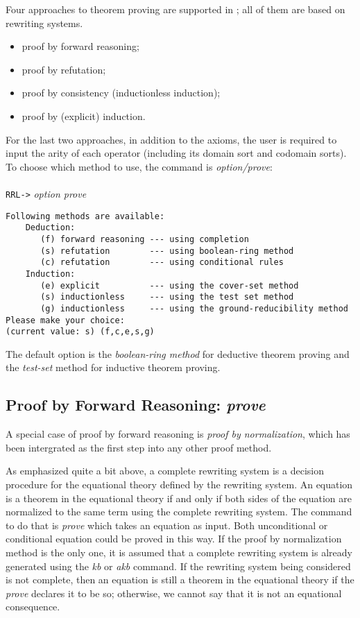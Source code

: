 Four approaches to theorem proving
are supported in \ERRL; all of them are based on rewriting systems.
\begin{itemize}
\item proof by forward reasoning;
\item proof by refutation;
\item proof by consistency (inductionless induction);
\item proof by (explicit) induction.
\end{itemize}
For the last two approaches, 
in addition to the axioms, 
the user is required
to input 
the arity of each operator 
(including its domain sort and codomain sorts).
To choose which method to use, the command is {\em option/prove}:\\ 
\\
{\tt RRL->} {\em option prove}
\begin{verbatim}
Following methods are available:
    Deduction:
       (f) forward reasoning --- using completion
       (s) refutation        --- using boolean-ring method
       (c) refutation        --- using conditional rules
    Induction:
       (e) explicit          --- using the cover-set method
       (s) inductionless     --- using the test set method
       (g) inductionless     --- using the ground-reducibility method
Please make your choice: 
(current value: s) (f,c,e,s,g) 
\end{verbatim}
The default option is the {\em boolean-ring method} for 
deductive theorem proving
and the {\em test-set} method for inductive theorem proving.

\subsection{Proof by Forward Reasoning: \em prove} 

A special case of proof by forward reasoning is {\em proof by normalization},
which has been intergrated as the first step
into any other proof method.

As emphasized quite a bit above,
a complete rewriting system is a decision procedure
for the equational theory defined by the rewriting system.  An
equation is a theorem in the equational theory if and only if both sides of
the equation are normalized to the same term using the complete
rewriting system.  The command to do that is {\em prove}
which takes an equation as input.  Both unconditional or
conditional equation could be proved in this way.  
If the proof by normalization method is the only one,
it is assumed that
a complete rewriting system is already generated using the {\em kb} or
{\em akb} command. 
If the rewriting system being considered is not complete, then an equation is still a theorem in the equational theory
if the {\em prove} declares it to be so; otherwise, we cannot
say that it is not an equational consequence.


